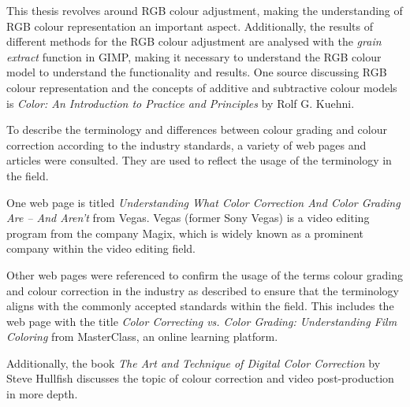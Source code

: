 \documentclass[../MasterThesis.tex]{subfiles}
\begin{document}
	
	\begin{description}[font=\color{RedViolet!80!black}, style=nextline]
		
		\item[RGB representation] 
		
		This thesis revolves around RGB colour adjustment, making the understanding of RGB colour representation an important aspect. Additionally, the results of different methods for the RGB colour adjustment are analysed with the \textit{grain extract} function in GIMP, making it necessary to understand the RGB colour model to understand the functionality and results.
		One source discussing RGB colour representation and the concepts of additive and subtractive colour models is \textit{Color: An Introduction to Practice and Principles} by Rolf G. Kuehni.~\cite{colourRGB} 
		
		
		
		
		\item[Colour grading] 
		
		To describe the terminology and differences between colour grading and colour correction according to the industry standards, a variety of web pages and articles were consulted. They are used to reflect the usage of the terminology in the field. 
		
		One web page is titled \textit{Understanding What Color Correction And Color Grading Are – And Aren’t} from Vegas. Vegas (former Sony Vegas) is a video editing program from the company Magix, which is widely known as a prominent company within the video editing field.~\cite{cc_cg_1}
		
		Other web pages were referenced to confirm the usage of the terms colour grading and colour correction in the industry as described to ensure that the terminology aligns with the commonly accepted standards within the field. This includes the web page with the title \textit{Color Correcting vs. Color Grading: Understanding Film Coloring} from MasterClass, an online learning platform.~\cite{cc_cg_2} 
		
		
		Additionally, the book \textit{The Art and Technique of Digital Color Correction} by Steve Hullfish discusses the topic of colour correction and video post-production in more depth.~\cite{cc1}
		
		
		

\end{description}
\end{document}
